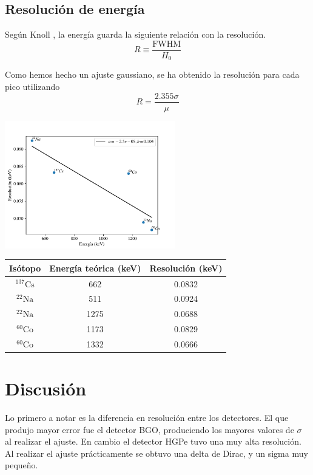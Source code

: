 \documentclass[a4paper, onecolumn]{article}
\begin{document}
		\subsection{Resolución de energía}

		Según Knoll \cite{knoll_radiation_2010}, la energía guarda la siguiente relación con la resolución.
		$$
		R \equiv \frac{\mathrm{FWHM}}{H_0}
		$$

		Como hemos hecho un ajuste gaussiano, se ha obtenido la resolución para cada pico utilizando
		$$
		R = \frac{2.355\sigma}{\mu}
		$$

		\begin{center}
			\includegraphics[width=210pt]{img/resolution_vs_energy.pdf}
		\end{center}

		\begin{center}
			{\renewcommand{\arraystretch}{1.5}
			\renewcommand{\tabcolsep}{0.2cm}
			\label{table_energy_resolution}
			\begin{tabular}{ c c c  }
				\hline
				Isótopo & Energía teórica (keV) & Resolución (keV) \\
				\hline
				${}^{137}\mathrm{Cs}$ & 662 & 0.0832\\ 
				${}^{22}\mathrm{Na}$  & 511 & 0.0924\\ 
				${}^{22}\mathrm{Na}$  & 1275 & 0.0688 \\ 
				${}^{60}\mathrm{Co}$ & 1173 & 0.0829 \\ 
				${}^{60}\mathrm{Co}$  & 1332 & 0.0666
			\end{tabular}}
		\end{center}
	\section{Discusión}
		Lo primero a notar es la diferencia en resolución entre los detectores. El que produjo mayor error fue el detector BGO, produciendo los mayores valores de $\sigma$ al realizar el ajuste. En cambio el detector HGPe tuvo una muy alta resolución. Al realizar el ajuste prácticamente se obtuvo una delta de Dirac, y un sigma muy pequeño.
\end{document}
